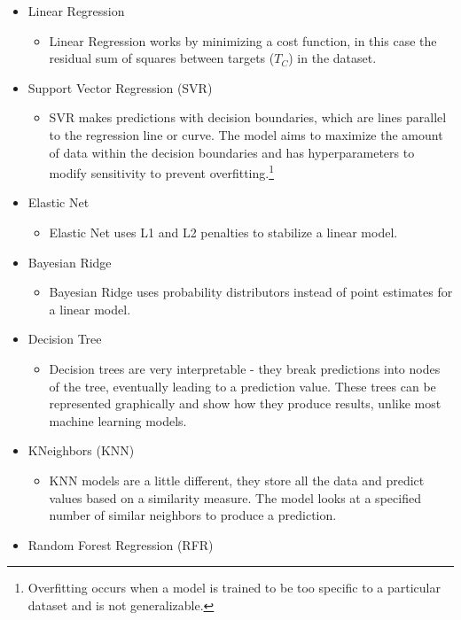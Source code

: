 \documentclass[twocolumn, nofootinbib, secnumarabic, amssymb, nobibnotes, aps, prd]{revtex4-2}
\begin{document}
\begin{itemize}
  \item Linear Regression
  \begin{itemize}
   \item  Linear Regression works by minimizing a cost function, in this case the residual sum of squares between targets ($T_C$) in the dataset. 
  \end{itemize}
  \item Support Vector Regression (SVR)
  \begin{itemize}
  		\item  SVR makes predictions with decision boundaries, which are lines parallel to the regression line or curve. The model aims to maximize the amount of data within the decision boundaries and has hyperparameters to modify sensitivity to prevent overfitting.\footnote{Overfitting occurs when a model is trained to be too specific to a particular dataset and is not generalizable.}
  \end{itemize}
  \item Elastic Net
  \begin{itemize}
  		\item Elastic Net uses L1 and L2 penalties to stabilize a linear model.
  \end{itemize}
  \item Bayesian Ridge
  \begin{itemize}
  		\item Bayesian Ridge uses probability distributors instead of point estimates for a linear model.
  \end{itemize}
  \item Decision Tree
  \begin{itemize}
  		\item Decision trees are very interpretable - they break predictions into nodes of the tree, eventually leading to a prediction value. These trees can be represented graphically and show how they produce results, unlike most machine learning models.
  \end{itemize}
  \item KNeighbors (KNN)
  \begin{itemize}
  		\item KNN models are a little different, they store all the data and predict values based on a similarity measure. The model looks at a specified number of similar neighbors to produce a prediction.
  \end{itemize}
  \item Random Forest Regression (RFR)

\end{itemize}
\end{document}
